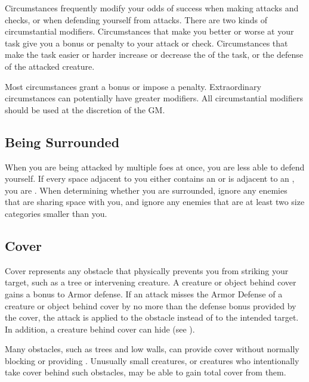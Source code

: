         Circumstances frequently modify your odds of success when making attacks and checks, or when defending yourself from attacks.
        There are two kinds of circumstantial modifiers.
        Circumstances that make you better or worse at your task give you a bonus or penalty to your attack or check.
        Circumstances that make the task easier or harder increase or decrease the  of the task, or the defense of the attacked creature.

        Most circumstances grant a  bonus or impose a  penalty.
        Extraordinary circumstances can potentially have greater modifiers.
        All circumstantial modifiers should be used at the discretion of the GM.\@

    \subsection{Being Surrounded}\label{Being Surrounded}
        When you are being attacked by multiple foes at once, you are less able to defend yourself.
        If every space adjacent to you either contains an  or is adjacent to an , you are \surrounded.
        When determining whether you are surrounded, ignore any enemies that are sharing space with you, and ignore any enemies that are at least two size categories smaller than you.

    \subsection{Cover}\label{Cover}

        Cover represents any obstacle that physically prevents you from striking your target, such as a tree or intervening creature.
        A creature or object behind cover gains a  bonus to Armor defense.
        If an attack misses the Armor Defense of a creature or object behind cover by no more than the defense bonus provided by the cover,
        the attack is applied to the obstacle instead of to the intended target.
        In addition, a creature behind cover can hide (see ).

         Many obstacles, such as trees and low walls, can provide cover without normally blocking  or providing .
        Unusually small creatures, or creatures who intentionally take cover behind such obstacles, may be able to gain total cover from them.

